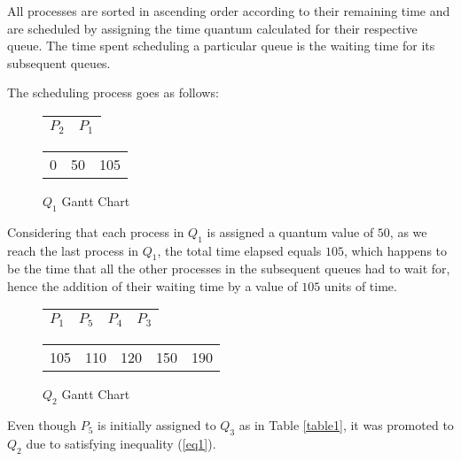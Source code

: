 \documentclass[conference]{IEEEtran}
\newcommand\T{\rule{0pt}{2.6ex}}       %
\newcommand\B{\rule[-1.2ex]{0pt}{0pt}} %
\begin{document}
All processes are sorted in ascending order according to their remaining time and are scheduled by assigning the time quantum calculated for their respective queue. The time spent scheduling a particular queue is the waiting time for its subsequent queues.

The scheduling process goes as follows:

\begin{figure}[H]
        \begin{center}
        \begin{tabular}{|c|c|}
         \hline
            $P_{2}$ & $P_{1}$\T\B\\ 
         \hline
        \end{tabular}
        \end{center}
        \begin{center}
            \begin{tabular}{c c c}
                   0 & 50 & 105\\ 
            \end{tabular}
        \end{center}
    \caption{$Q_{1}$ Gantt Chart}
\end{figure}

Considering that each process in $Q_{1}$ is assigned a quantum value of $50$, as we reach the last process in $Q_{1}$, the total time elapsed equals $105$, which happens to be the time that all the other processes in the subsequent queues had to wait for, hence the addition of their waiting time by a value of $105$ units of time.

\begin{figure}[H]
    \begin{center}
    \begin{tabular}{|c|c|c|c|}
     \hline
        $P_{1}$ & $P_{5}$ & $P_{4}$ & $P_{3}$\T\B\\ 
     \hline
    \end{tabular}
    \end{center}
    \begin{center}
        \begin{tabular}{c c c c c}
               105 & 110 & 120 & 150 & 190\\ 
        \end{tabular}
    \end{center}
\caption{$Q_{2}$ Gantt Chart}
\end{figure}

Even though $P_{5}$ is initially assigned to $Q_{3}$ as in Table \ref{table1}, it was promoted to $Q_{2}$ due to satisfying inequality (\ref{eq1}).
\end{document}
